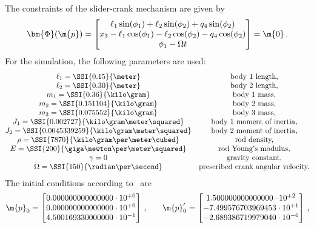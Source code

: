 %
The constraints of the slider-crank mechanism are given by
%
\begin{equation*}
  \bm{\Phi}(\m{p}) = \begin{bmatrix}
    \ell_1\sin(\phi_1) + \ell_2\sin(\phi_2) + q_4\sin(\phi_2) \\
    x_3 - \ell_1\cos(\phi_1) - \ell_2\cos(\phi_2) - q_4\cos(\phi_2) \\
    \phi_1 - \Omega t \\
  \end{bmatrix} = \m{0} \, \text{.}
\end{equation*}
%
For the simulation, the following parameters are used:
%
\begin{equation*}
  \begin{matrix}
    \ell_1 = \SSI{0.15}{\meter} & \text{body 1 length,} \\
    \ell_2 = \SSI{0.30}{\meter} & \text{body 2 length,} \\
    m_1 = \SSI{0.36}{\kilo\gram} & \text{body 1 mass,} \\
    m_2 = \SSI{0.151104}{\kilo\gram} & \text{body 2 mass,} \\
    m_3 = \SSI{0.075552}{\kilo\gram} & \text{body 3 mass,} \\
    J_1 = \SSI{0.002727}{\kilo\gram\meter\squared} & \text{body 1 moment of inertia,} \\
    J_2 = \SSI{0.0045339259}{\kilo\gram\meter\squared} & \text{body 2 moment of inertia,} \\
    \rho = \SSI{7870}{\kilo\gram\per\meter\cubed} & \text{rod density,} \\
    E = \SSI{200}{\giga\newton\per\meter\squared} & \text{rod Young's modulus,} \\
    \gamma = 0 & \text{gravity constant,} \\
    \Omega = \SSI{150}{\radian\per\second} & \text{prescribed crank angular velocity.} \\
  \end{matrix}
\end{equation*}
%
The initial conditions according to~\cite{lioen1998test, mazzia2008test} are
%
\begin{equation*}
  \m{p}_{0} = \begin{bmatrix}
    0.000000000000000\cdot10^{+0} \\
    0.000000000000000\cdot10^{+0} \\
    4.500169330000000\cdot10^{-1}
  \end{bmatrix} \, \text{,} \qquad
  \m{p}^{\prime}_{0} = \begin{bmatrix}
     1.500000000000000\cdot10^{+2} \\
    -7.499576703969453\cdot10^{+1} \\
    -2.689386719979040\cdot10^{-6}
  \end{bmatrix} \, \text{,}
\end{equation*}
